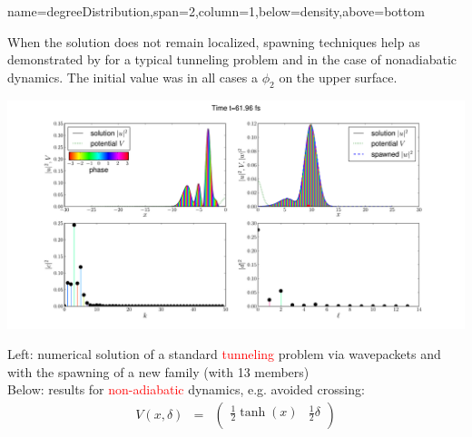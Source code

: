\documentclass[b0paper,portrait,fontscale=0.24]{baposter}
\newcommand{\alert}[1]{\textcolor{red}{#1}}
\begin{document}
\begin{poster}
  {name=degreeDistribution,span=2,column=1,below=density,above=bottom}{
    When the solution does not remain localized,
    spawning techniques help as demonstrated by \citet{GHJ_exponentially_accurate,GHJ_tunneling_spawning}
    for a typical tunneling problem and \citet{BGH_natac} in the case of
    nonadiabatic dynamics. The initial value was in all cases a $\phi_{2}$
    on the upper surface.
    \begin{minipage}[c]{.49\linewidth}
      \includegraphics[width=\textwidth]{packetFAM00012000.pdf}
    \end{minipage}
    \begin{minipage}[c]{.5\linewidth}
      Left:
      {numerical solution of a standard \alert{tunneling} problem
        via wavepackets and with the spawning of a new family (with 13 members)}\\
      Below: results for
      \alert{non-adiabatic} dynamics,      e.g. avoided crossing:
      \begin{eqnarray*}\label{III:tanhex}
        V(x,\delta)& = &
        \begin{pmatrix}
          \frac12\tanh(x) & \frac12\delta \\

\end{pmatrix}
\end{eqnarray*}
\end{minipage}}
\end{poster}
\end{document}
